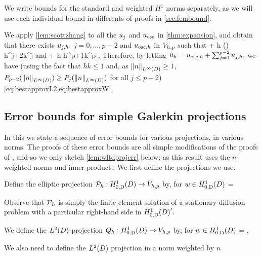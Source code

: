 We write bounds for the standard and weighted $H^1$ norms separately, as we will use each individual bound in differents of proofs in \cref{sec:fembound}.

We apply \cref{lem:scottzhang} to all the $u_{j}$ and $u_{\mathrm{osc}}$ in \cref{thm:expansion}, and obtain that there exists $u_{j,h},$ $j=0,\ldots,p-2$ and $u_{\mathrm{osc},h}$ in $V_{h,p}$ such that 
\beqs
\NLtD{\usj - \ujh} + h\NHoD{\usj - \ujh} \leq {}  \Pj\mleft(\mright) h^{j+2}k^j \Cfg
\eeqs
and
\beqs
\NLtD{\uosc - \uosch} + h\NHoD{\uosc - \uosch} \leq {} \Cosc\CAnk h^{p+1}k^p \Cfg.
\eeqs
Therefore, by letting $\hat{u}_{h} = u_{\mathrm{osc},h} + \sum_{j=0}^{p-2} u_{j,h},$ we have (using the fact that $hk \leq 1$ and, as $\NLiD{n} \geq 1$, $\Pfn{p-2}(\NLiD{n}) \geq \Pfn{j}(\NLiD{n})$ for all $j \leq p-2$) \cref{eq:bestapproxL2,eq:bestapproxW}.
\epf

\subsection{Error bounds for simple Galerkin projections}\label{sec:errgalerkin}
In this  we state a sequence of error bounds for various projections, in various norms. The proofs of these error bounds are all simple modifications of the proofs of \cite[Theorem 5.8.3]{BrSc:08},  and so we only sketch \cref{lem:wltdprojerr} below; as this result uses the $n$-weighted norms and inner product.. %
We first define the projections we use.

Define the elliptic projection $\Ph:\HozDD\rightarrow\Vhp$ by, for $w \in \HozDD$
\beqs
{} =  \tforall \vh \in \Vhp
\eeqs

Observe that $\mathcal P_{h}$ is simply the finite-element solution of a stationary diffusion problem with a particular right-hand side in $\HozDD'.$

We define the $\LtD$-projection $\Qh:\HozDD\rightarrow \Vhp$ by, for $w \in \HozDD$
\beqs
{} =  \tforall \vh \in \Vhp.
\eeqs

We also need to define the $\LtD$ projection in a norm weighted by $n$

